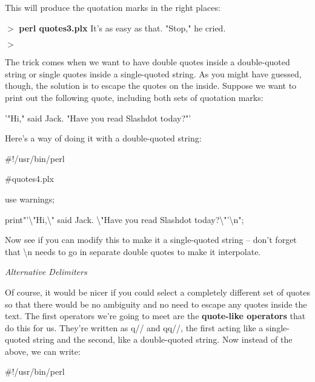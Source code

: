 \documentclass[a4paper,11pt]{book}
\begin{document}
\noindent 

\noindent This will produce the quotation marks in the right places:

\noindent 

\noindent $>$ \textbf{perl quotes3.plx }It's as easy as that. "Stop," he cried.

\noindent $>$

\noindent 

\noindent The trick comes when we want to have double quotes inside a double-quoted string or single quotes inside a single-quoted string. As you might have guessed, though, the solution is to escape the quotes on the inside. Suppose we want to print out the following quote, including both sets of quotation marks:

\noindent 

\noindent '"Hi," said Jack. "Have you read Slashdot today?"'

\noindent 

\noindent Here's a way of doing it with a double-quoted string:

\noindent 

\noindent 

\noindent \#!/usr/bin/perl

\noindent \#quotes4.plx

\noindent use warnings;

\noindent print"'\textbackslash "Hi,\textbackslash " said Jack. \textbackslash "Have you read Slashdot today?\textbackslash "'\textbackslash n";

\noindent 

\noindent Now see if you can modify this to make it a single-quoted string -- don't forget that \textbackslash n needs to go in separate double quotes to make it interpolate.

\noindent 

\noindent 

\noindent \textit{Alternative Delimiters}

\noindent Of course, it would be nicer if you could select a completely different set of quotes so that there would be no ambiguity and no need to escape any quotes inside the text. The first operators we're going to meet are the \textbf{quote-like operators }that do this for us. They're written as q// and qq//, the first acting like a single-quoted string and the second, like a double-quoted string. Now instead of the above, we can write:

\noindent 

\noindent \#!/usr/bin/perl
\end{document}
